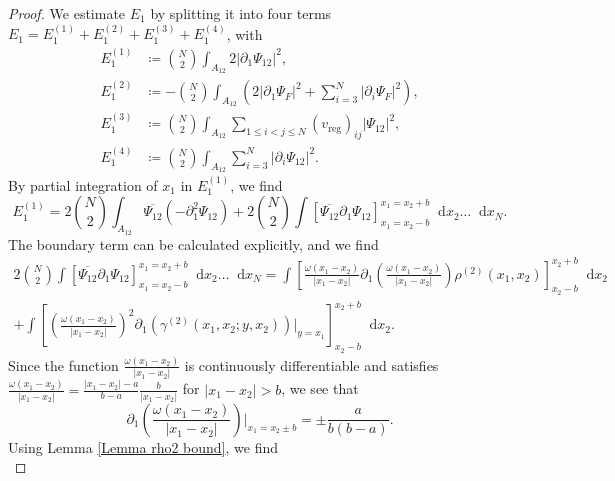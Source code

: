 \documentclass[a4paper,11pt]{article}
\newcommand{\abs}[1]{\left\lvert #1 \right\rvert}
\newcommand*\diff{\mathop{}\!\mathrm{d}}
\numberwithin{equation}{section}
\begin{document}
	\begin{proof}
		We estimate $ E_1 $ by splitting it into four terms $ E_1=E_1^{(1)}+E_1^{(2)}+E_1^{(3)}+E_1^{(4)} $, with
		\begin{equation}
			\begin{aligned}
				E_1^{(1)}&\coloneqq \binom{N}{2}\int_{A_{12}}2\abs{\partial_1\Psi_{12}}^2,\\
				E_1^{(2)}&\coloneqq-\binom{N}{2}\int_{A_{12}}\left(2\abs{\partial_1\Psi_F}^2+\sum_{i=3}^{N}\abs{\partial_i\Psi_F}^2\right),\\
				E^{(3)}_1&\coloneqq\binom{N}{2}\int_{A_{12}} \sum_{1\leq i<j\leq N}(v_{\text{reg}})_{ij}\abs{\Psi_{12}}^2,\\
				E_1^{(4)}&\coloneqq\binom{N}{2}\int_{A_{12}}\sum_{i=3}^{N}\abs{\partial_i\Psi_{12}}^2.
			\end{aligned}
		\end{equation}
		By partial integration of $x_1$ in $E_1^{(1)}$, we find\begin{equation}
			E_1^{(1)}=2\binom{N}{2}\int_{A_{12}}\overline{\Psi_{12}}\left( -\partial^2_1 \Psi_{12} \right)+2\binom{N}{2}\int\left[\overline{\Psi_{12}}\partial_1\Psi_{12}\right]_{x_1=x_2-b}^{x_1=x_2+b}\diff x_2\dots\diff x_N.
		\end{equation} 
		The boundary term can be calculated explicitly, and we find \begin{equation}
			\begin{aligned}
				2\binom{N}{2}\int\left[\overline{\Psi_{12}}\partial_1\Psi_{12}\right]_{x_1=x_2-b}^{x_1=x_2+b}\diff x_2\dots\diff x_N=\int\left[\frac{\omega(x_1-x_2)}{\abs{x_1-x_2}}\partial_{1}\left(\frac{\omega(x_1-x_2)}{\abs{x_1-x_2}}\right)\rho^{(2)}(x_1,x_2)\right]_{x_2-b}^{x_2+b}\diff x_2\\+\int\left[\left(\frac{\omega(x_1-x_2)}{\abs{x_1-x_2}}\right)^2\partial_{1}\left(\gamma^{(2)}(x_1,x_2;y,x_2)\right)\bigg\vert_{y=x_1}\right]_{x_2-b}^{x_2+b}\diff x_2.
			\end{aligned}
		\end{equation}
		Since the function $ \frac{\omega(x_1-x_2)}{\abs{x_1-x_2}} $ is continuously differentiable and satisfies $ \frac{\omega(x_1-x_2)}{\abs{x_1-x_2}}=\frac{\abs{x_1-x_2}-a}{b-a}\frac{b}{\abs{x_1-x_2}} $ for $ \abs{x_1-x_2}>b $, we see that \begin{equation}
			\partial_{1}\left(\frac{\omega(x_1-x_2)}{\abs{x_1-x_2}}\right)\bigg\vert_{x_1=x_2\pm b}=\pm\frac{a}{b(b-a)}.
		\end{equation}
		Using Lemma \ref{Lemma rho2 bound}, we find \begin{equation}

\end{equation}
\end{proof}
\end{document}

